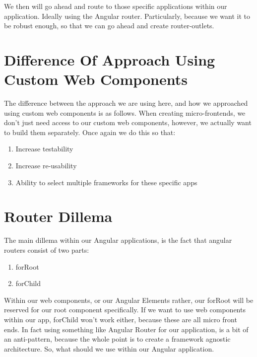 We then will go ahead and route to those specific applications within our application. Ideally using the Angular router. Particularly, because we want it to be robust enough, so that we can go ahead and create router-outlets. 

\section{Difference Of Approach Using Custom Web Components}
The difference between the approach we are using here, and how we approached using custom web components is as follows. When creating micro-frontends, we don't just need access to our custom web components, however, we actually want to build them separately. Once again we do this so that: 
\begin{enumerate}
  \item Increase testability
  \item Increase re-usability
  \item Ability to select multiple frameworks for these specific apps
\end{enumerate}

\section{Router Dillema}
The main dillema within our Angular applications, is the fact that angular routers consist of two parts: 
\begin{enumerate}
  \item forRoot
  \item forChild
\end{enumerate}

Within our web components, or our Angular Elements rather, our forRoot will be reserved for our root component specifically. If we want to use web components within our app, forChild won't work either, because these are all micro front ends. In fact using something like Angular Router for our application, is a bit of an anti-pattern, because the whole point is to create a framework agnostic architecture. So, what should we use within our Angular application. 
